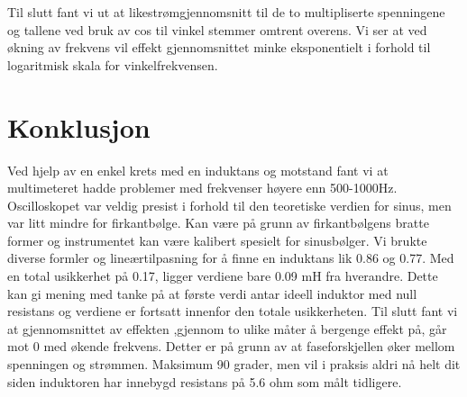 \documentclass[norsk,a4paper,12pt]{article}
\begin{document}
Til slutt fant vi ut at likestrømgjennomsnitt til de to multipliserte spenningene og tallene ved bruk av cos til vinkel stemmer omtrent overens. Vi ser at ved økning av frekvens vil effekt gjennomsnittet minke eksponentielt i forhold til logaritmisk skala for vinkelfrekvensen.

\section{Konklusjon}

Ved hjelp av en enkel krets med en induktans og motstand fant vi at multimeteret hadde problemer med frekvenser høyere enn 500-1000Hz. Oscilloskopet var veldig presist i forhold til den teoretiske verdien for sinus, men var litt mindre for firkantbølge. Kan være på grunn av firkantbølgens bratte former og instrumentet kan være kalibert spesielt for sinusbølger. Vi brukte diverse formler og lineærtilpasning for å finne en induktans lik 0.86 og 0.77. Med en total usikkerhet på 0.17, ligger verdiene bare 0.09 mH fra hverandre. Dette kan gi mening med tanke på at første verdi antar ideell induktor med null resistans og verdiene er fortsatt innenfor den totale usikkerheten. Til slutt fant vi at gjennomsnittet av effekten ,gjennom to ulike måter å bergenge effekt på, går mot 0 med økende frekvens. Detter er på grunn av at faseforskjellen øker mellom spenningen og strømmen. Maksimum 90 grader, men vil i praksis aldri nå helt dit siden induktoren har innebygd resistans på 5.6 ohm som målt tidligere.



\end{document}
